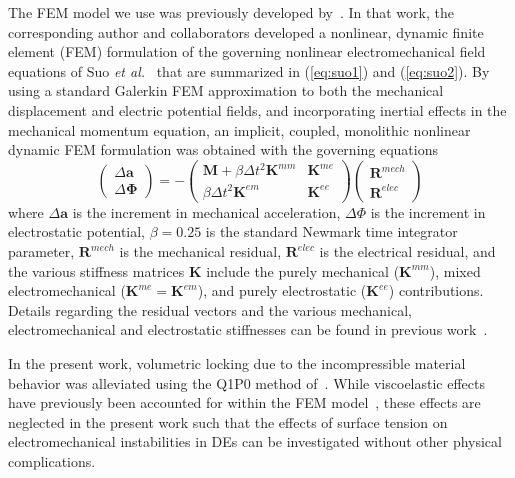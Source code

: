 \documentclass[final,authoryear,3p,times,twocolumn]{elsarticle}
\newcommand{\mbf}{\mathbf}
\begin{document}
The FEM model we use was previously developed by~\citet{parkIJSS2012}.  In that work, the corresponding author and collaborators developed a nonlinear, dynamic finite element (FEM) formulation of the governing nonlinear electromechanical field equations of Suo \emph{et al.}~\cite{suoJMPS2008} that are summarized in (\ref{eq:suo1}) and (\ref{eq:suo2}).  By using a standard Galerkin FEM approximation to both the mechanical displacement and electric potential fields, and incorporating inertial effects in the mechanical momentum equation, an implicit, coupled, monolithic nonlinear dynamic FEM formulation was obtained with the governing equations~\citep{parkIJSS2012}
\begin{equation}\label{eq:fe1} \left(\begin{array}{cc}{\Delta\mbf{a}} \\ {\Delta\mbf{\Phi}}\end{array}\right)=-\left(\begin{array}{cc} {\mbf{M}+\beta\Delta t^{2}\mbf{K}^{mm}} & {\mbf{K}^{me}} \\ {\beta\Delta t^{2}\mbf{K}^{em}} & {\mbf{K}^{ee}} \end{array}\right)\left(\begin{array}{cc}{\mbf{R}^{mech}} \\ {\mbf{R}^{elec}}\end{array}\right)
\end{equation}
where $\Delta\mbf{a}$ is the increment in mechanical acceleration, $\Delta\Phi$ is the increment in electrostatic potential, $\beta=0.25$ is the standard Newmark time integrator parameter, $\mbf{R}^{mech}$ is the mechanical residual, $\mbf{R}^{elec}$ is the electrical residual, and the various stiffness matrices $\mbf{K}$ include the purely mechanical ($\mbf{K}^{mm}$), mixed electromechanical ($\mbf{K}^{me}=\mbf{K}^{em}$), and purely electrostatic ($\mbf{K}^{ee}$) contributions.  Details regarding the residual vectors and the various mechanical, electromechanical and electrostatic stiffnesses can be found in previous work~\citep{parkIJSS2012}.  

In the present work, volumetric locking due to the incompressible material behavior was alleviated using the Q1P0 method of~\citet{simoCMAME1985}.  While viscoelastic effects have previously been accounted for within the FEM model~\citep{parkSM2013}, these effects are neglected in the present work such that the effects of surface tension on electromechanical instabilities in DEs can be investigated without other physical complications.
\end{document}
